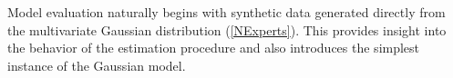 \documentclass[11pt]{article}
\newcommand{\R}{\mathbb{R}}
\newcommand{\E}{\mathbb{E}}
\theoremstyle{definition}
\theoremstyle{definition}
\def\E{{\mathbb E}}
\begin{document}
%
%





%
Model evaluation naturally begins with synthetic data generated directly from the multivariate Gaussian distribution (\ref{NExperts}). This  provides insight into the behavior of the estimation procedure and also introduces the simplest instance of the Gaussian model.
\end{document}
